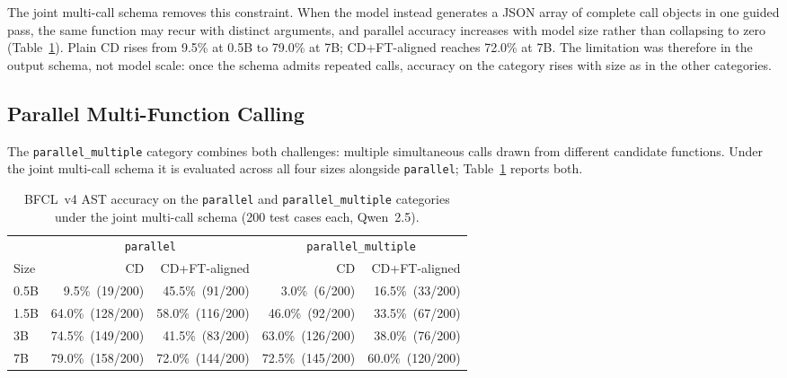 The joint multi-call schema removes this constraint. When the model instead
generates a JSON array of complete call objects in one guided pass, the same
function may recur with distinct arguments, and parallel accuracy increases
with model size rather than collapsing to zero
(Table~\ref{tab:bfcl-parallel-multiple}). Plain CD rises from 9.5\% at 0.5B
to 79.0\% at 7B; CD+FT-aligned reaches 72.0\% at 7B. The limitation was
therefore in the output schema, not model scale: once the schema admits
repeated calls, accuracy on the category rises with size as in the other
categories.

\subsection{Parallel Multi-Function Calling}

The \texttt{parallel\_multiple} category combines both challenges: multiple
simultaneous calls drawn from different candidate functions. Under the joint
multi-call schema it is evaluated across all four sizes alongside
\texttt{parallel}; Table~\ref{tab:bfcl-parallel-multiple} reports both.

\begin{table}[ht]
\centering
\caption{BFCL~v4 AST accuracy on the \texttt{parallel} and
\texttt{parallel\_multiple} categories under the joint multi-call schema
(200 test cases each, Qwen~2.5).}
\label{tab:bfcl-parallel-multiple}
\begin{tabular}{lrrrr}
\toprule
& \multicolumn{2}{c}{\texttt{parallel}} & \multicolumn{2}{c}{\texttt{parallel\_multiple}} \\
\cmidrule(lr){2-3}\cmidrule(lr){4-5}
Size & CD & CD+FT-aligned & CD & CD+FT-aligned \\
\midrule
0.5B & 9.5\%\ (19/200)  & 45.5\%\ (91/200)  & 3.0\%\ (6/200)   & 16.5\%\ (33/200) \\
1.5B & 64.0\%\ (128/200) & 58.0\%\ (116/200) & 46.0\%\ (92/200) & 33.5\%\ (67/200) \\
3B   & 74.5\%\ (149/200) & 41.5\%\ (83/200)  & 63.0\%\ (126/200)& 38.0\%\ (76/200) \\
7B   & 79.0\%\ (158/200) & 72.0\%\ (144/200) & 72.5\%\ (145/200)& 60.0\%\ (120/200) \\
\bottomrule
\end{tabular}
\end{table}


